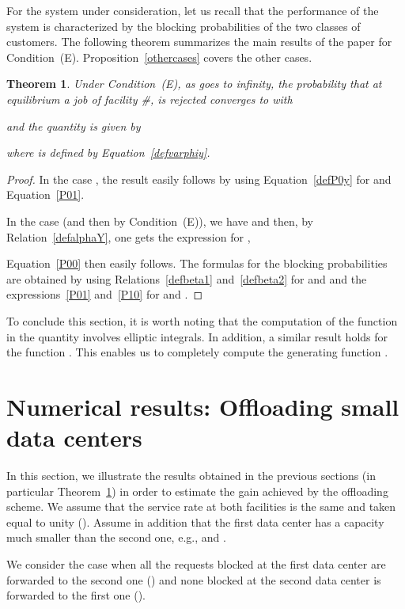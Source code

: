 \documentclass{amsart}
\newtheorem{theorem}{Theorem}
\begin{document}
For the system under consideration, let us recall that the performance of the system is characterized by the blocking probabilities of the two classes of customers. The following theorem summarizes the main results of the paper for Condition~(E). Proposition~\ref{othercases} covers the other cases. 
\begin{theorem}\label{TheoLoss}
Under Condition~(E), as  goes to infinity, the probability that at equilibrium a job of facility \#,  is rejected converges to  with 

and the quantity  is given by

where  is defined by Equation~\eqref{defvarphiy}.
\end{theorem}
\begin{proof}
In the case , the result easily follows by using Equation~\eqref{defP0y} for  and Equation~\eqref{P01}.

In the case  (and then  by Condition~(E)), we have  and then, by Relation~\eqref{defalphaY}, one gets the expression for ,

Equation~\eqref{P00} then easily follows. The formulas for the blocking probabilities are obtained by using Relations~\eqref{defbeta1} and~\eqref{defbeta2} for  and  and the expressions~\eqref{P01} and~\eqref{P10} for  and . 
\end{proof}

To conclude this section, it is worth noting that the computation of the function  in the quantity  involves elliptic integrals. In addition, a similar result holds for the function . This enables us to completely compute the generating function .

\section{Numerical results: Offloading small data centers}\label{App}

In this section, we illustrate the results obtained in the previous sections (in particular Theorem~\ref{TheoLoss}) in order to estimate the gain achieved by the offloading scheme. We assume that the service rate at  both facilities is the same and taken equal to unity (). Assume in addition that the first data center has a capacity much smaller than the second one, e.g.,  and .

We consider the case when all the requests blocked at the first data center are forwarded to the second one () and none blocked at the second data center is forwarded to the first one (). 
\end{document}
